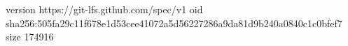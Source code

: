 version https://git-lfs.github.com/spec/v1
oid sha256:505fa29c11f678e1d53cee41072a5d56227286a9da81d9b240a0840c1c0bfef7
size 174916
